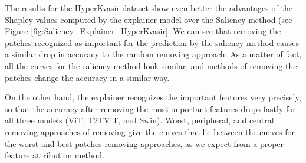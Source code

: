 \documentclass[magisterska,en]{pracamgr}
\begin{document}
The results for the HyperKvasir dataset show even better the advantages of the Shapley values computed by the explainer model over the Saliency method (see Figure \ref{fig:Saliency_Explainer_HyperKvasir}. We can see that removing the patches recognized as important for the prediction by the saliency method causes a similar drop in accuracy to the random removing approach. As a matter of fact, all the curves for the saliency method look similar, and methods of removing the patches change the accuracy in a similar way.

On the other hand, the explainer recognizes the important features very precisely, so that the accuracy after removing the most important features drops fastly for all three models (ViT, T2T\textunderscore ViT, and Swin). Worst, peripheral, and central removing approaches of removing give the curves that lie between the curves for the worst and best patches removing approaches, as we expect from a proper feature attribution method.
\end{document}
